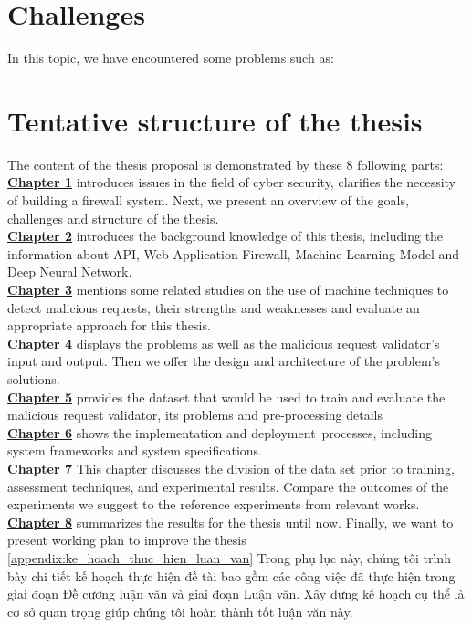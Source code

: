 \section{Challenges}
\label{sec:challenges}
In this topic, we have encountered some problems such as:
\section{Tentative structure of the thesis}
\label{sec:structure}
	\newcommand\nextintro{\\[4mm]}
	The content of the thesis proposal is demonstrated by these 8 following parts: \nextintro
	\hyperref[chap:introduction]{\textbf{Chapter 1}} introduces issues in the field of cyber security, clarifies the necessity of building a firewall system. Next, we present an overview of the goals, challenges and structure of the thesis.\nextintro
	\hyperref[chap:backgrounds]{\textbf{Chapter 2}} introduces the background knowledge of this thesis, including the information about API, Web Application Firewall, Machine Learning Model and Deep Neural Network.\nextintro
	\hyperref[chap:literaturereview]{\textbf{Chapter 3}} mentions some related studies on the use of machine techniques to detect malicious requests, their strengths and weaknesses and evaluate an appropriate approach for this thesis.\nextintro
	\hyperref[chap:phuong_an_de_xuat]{\textbf{Chapter 4}} displays the problems as well as the malicious request validator's input and output. Then we offer the design and architecture of the problem's solutions.\nextintro
	\hyperref[chap:tap_du_lieu]{\textbf{Chapter 5}} provides the dataset that would be used to train and evaluate the malicious request validator, its problems and pre-processing details\nextintro
	\hyperref[chap:hien_thuc_he_thong]{\textbf{Chapter 6}} shows the implementation and deployment processes, including system frameworks and system specifications.\nextintro
	\hyperref[chap:thi_nghiem_va_danh_gia]{\textbf{Chapter 7}} This chapter discusses the division of the data set prior to training, assessment techniques, and experimental results. Compare the outcomes of the experiments we suggest to the reference experiments from relevant works.\nextintro
	\hyperref[chap:tong_ket]{\textbf{Chapter 8}} summarizes the results for the thesis until now. Finally, we want to present working plan to improve the thesis\nextintro
	\ref{appendix:ke_hoach_thuc_hien_luan_van} Trong phụ lục này, chúng tôi trình bày chi tiết kế hoạch thực hiện đề tài bao gồm các công việc đã thực hiện trong giai đoạn Đề cương luận văn và giai đoạn Luận văn. Xây dựng kế hoạch cụ thể là cơ sở quan trọng giúp chúng tôi hoàn thành tốt luận văn này.